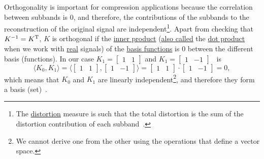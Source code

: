 Orthogonality is important for compression applications because the
correlation between subbands is 0, and therefore, the contributions of
the subbands to the reconstruction of the original signal are
independent\footnote{The
\href{https://en.wikipedia.org/wiki/Distortion}{distortion} measure is
such that the total distortion is the sum of the distortion
contribution of each subband~\cite{sayood2017introduction}.}. Apart
from checking that $K^{-1}=K^{\text T}$, $K$ is orthogonal if the
\href{https://en.wikipedia.org/wiki/Inner_product_space}{inner
  product}
(\href{https://math.stackexchange.com/questions/476738/difference-between-dot-product-and-inner-product}{also
  called} the \href{https://en.wikipedia.org/wiki/Dot_product}{dot
  product} when we work with
\href{https://en.wikipedia.org/wiki/Real_number}{real} signals) of the
\href{https://en.wikipedia.org/wiki/Basis_(linear_algebra)}{basis
  functions} is $0$ between the different basis (functions). In our
case $K_1=\begin{bmatrix}1 & 1\end{bmatrix}$ and $K_1=\begin{bmatrix}
1 & -1\end{bmatrix}$~ is
\begin{equation}
  \langle K_0,K_1 \rangle =
  \langle \begin{bmatrix}
    1 & 1
  \end{bmatrix}
  ,
  \begin{bmatrix}
    1 & -1
  \end{bmatrix}
  \rangle =
  \begin{bmatrix}
    1 & 1
  \end{bmatrix}
  \cdot
  \begin{bmatrix}
    1 & -1
  \end{bmatrix}
   = 0,
\end{equation}
which means that $K_0$ and $K_1$ are linearly independent\footnote{We
cannot derive one from the other using the operations that define a
vector space.}, and therefore they form a basis
(set)~\cite{strang4linear}.

